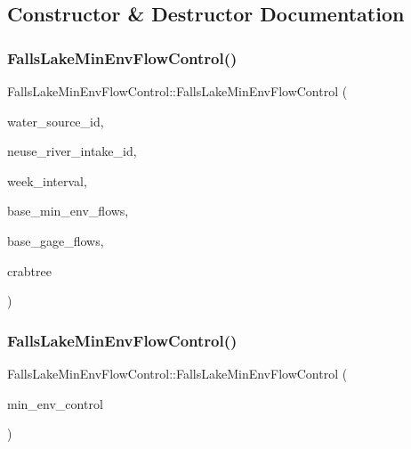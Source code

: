\subsection{Constructor \& Destructor Documentation}
\mbox{\label{classFallsLakeMinEnvFlowControl_a9cef248e2fd8a194c92454a79398a6a6}} 
\subsubsection{\texorpdfstring{Falls\+Lake\+Min\+Env\+Flow\+Control()}{FallsLakeMinEnvFlowControl()}\hspace{0.1cm}{\footnotesize\ttfamily [1/2]}}
{\footnotesize\ttfamily Falls\+Lake\+Min\+Env\+Flow\+Control\+::\+Falls\+Lake\+Min\+Env\+Flow\+Control (\begin{DoxyParamCaption}\item[{int}]{water\+\_\+source\+\_\+id,  }\item[{int}]{neuse\+\_\+river\+\_\+intake\+\_\+id,  }\item[{vector$<$ int $>$}]{week\+\_\+interval,  }\item[{vector$<$ double $>$}]{base\+\_\+min\+\_\+env\+\_\+flows,  }\item[{vector$<$ double $>$}]{base\+\_\+gage\+\_\+flows,  }\item[{\mbox{\hyperlink{classCatchment}{Catchment}} \&}]{crabtree }\end{DoxyParamCaption})}

\mbox{\label{classFallsLakeMinEnvFlowControl_a0ac46bcd8bea2e6e56824b5398129418}} 
\subsubsection{\texorpdfstring{Falls\+Lake\+Min\+Env\+Flow\+Control()}{FallsLakeMinEnvFlowControl()}\hspace{0.1cm}{\footnotesize\ttfamily [2/2]}}
{\footnotesize\ttfamily Falls\+Lake\+Min\+Env\+Flow\+Control\+::\+Falls\+Lake\+Min\+Env\+Flow\+Control (\begin{DoxyParamCaption}\item[{const \mbox{\hyperlink{classFallsLakeMinEnvFlowControl}{Falls\+Lake\+Min\+Env\+Flow\+Control}} \&}]{min\+\_\+env\+\_\+control }\end{DoxyParamCaption})}

